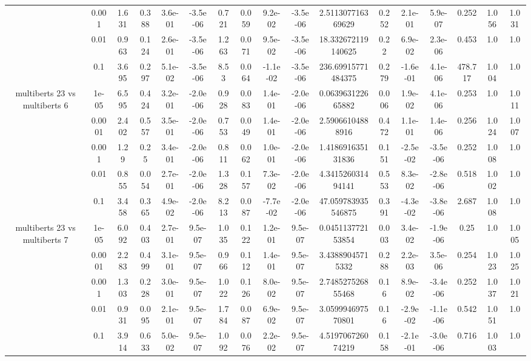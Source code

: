 \begin{tabular}{|c|c|c|c|c|c|c|c|c|c|c|c|c|c|c|c|c|}
 & 0.001 & 1.631 & 0.388 & 3.6e-01 & -3.5e-06 & 0.721 & 0.059 & 9.2e-02 & -3.5e-06 & 2.511307716369629 & 0.252 & 2.1e-01 & 5.9e-07 & 0.252 & 1.056 & 1.031 \\
 & 0.01 & 0.963 & 0.124 & 2.6e-01 & -3.5e-06 & 1.263 & 0.071 & 9.5e-02 & -3.5e-06 & 18.332672119140625 & 0.22 & 6.9e-02 & 2.3e-06 & 0.453 & 1.0 & 1.0 \\
 & 0.1 & 3.695 & 0.297 & 5.1e-02 & -3.5e-06 & 8.53 & 0.064 & -1.1e-02 & -3.5e-06 & 236.69915771484375 & 0.279 & -1.6e-01 & 4.1e-06 & 478.717 & 1.004 & 1.0 \\
\hline
\multirow{5}{*}{multiberts 23 vs multiberts 6} & 1e-05 & 6.595 & 0.424 & 3.2e-01 & -2.0e-06 & 0.928 & 0.083 & 1.4e-01 & -2.0e-06 & 0.063963122665882 & 0.006 & 1.9e-02 & 4.1e-06 & 0.253 & 1.0 & 1.011 \\
 & 0.0001 & 2.402 & 0.557 & 3.5e-01 & -2.0e-06 & 0.753 & 0.049 & 1.4e-01 & -2.0e-06 & 2.59066104888916 & 0.472 & 1.1e-01 & 1.4e-06 & 0.256 & 1.024 & 1.007 \\
 & 0.001 & 1.29 & 0.25 & 3.4e-01 & -2.0e-06 & 0.811 & 0.062 & 1.0e-01 & -2.0e-06 & 1.418691635131836 & 0.151 & -2.5e-02 & -3.5e-06 & 0.252 & 1.008 & 1.0 \\
 & 0.01 & 0.855 & 0.054 & 2.7e-01 & -2.0e-06 & 1.328 & 0.157 & 7.3e-02 & -2.0e-06 & 4.341526031494141 & 0.553 & 8.3e-02 & -2.8e-06 & 0.518 & 1.002 & 1.0 \\
 & 0.1 & 3.458 & 0.365 & 4.9e-02 & -2.0e-06 & 8.213 & 0.087 & -7.7e-02 & -2.0e-06 & 47.059783935546875 & 0.391 & -4.3e-02 & -3.8e-06 & 2.687 & 1.008 & 1.0 \\
\hline
\multirow{5}{*}{multiberts 23 vs multiberts 7} & 1e-05 & 6.092 & 0.403 & 2.7e-01 & 9.5e-07 & 1.035 & 0.122 & 1.2e-01 & 9.5e-07 & 0.045113772153854 & 0.003 & 3.4e-02 & -1.9e-06 & 0.25 & 1.0 & 1.005 \\
 & 0.0001 & 2.283 & 0.499 & 3.1e-01 & 9.5e-07 & 0.966 & 0.112 & 1.4e-01 & 9.5e-07 & 3.43889045715332 & 0.288 & 2.2e-03 & 3.5e-06 & 0.254 & 1.023 & 1.025 \\
 & 0.001 & 1.303 & 0.228 & 3.0e-01 & 9.5e-07 & 1.022 & 0.126 & 8.0e-02 & 9.5e-07 & 2.748527526855468 & 0.16 & 8.9e-02 & -3.4e-06 & 0.252 & 1.037 & 1.021 \\
 & 0.01 & 0.931 & 0.095 & 2.1e-01 & 9.5e-07 & 1.784 & 0.087 & 6.9e-02 & 9.5e-07 & 3.059994697570801 & 0.16 & -2.9e-02 & -1.1e-06 & 0.542 & 1.051 & 1.0 \\
 & 0.1 & 3.914 & 0.633 & 5.0e-02 & 9.5e-07 & 1.092 & 0.076 & 2.2e-02 & 9.5e-07 & 4.519706726074219 & 0.158 & -2.1e-01 & -3.0e-06 & 0.716 & 1.003 & 1.0 \\

\end{tabular}
